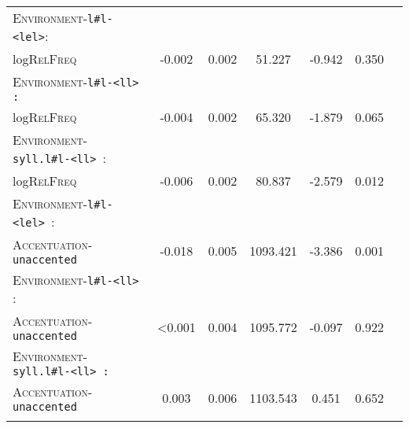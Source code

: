 \begin{table}
{\begin{tabular}{lSSSSSS}
		\textsc{Environment}-\texttt{l\#l-<lel>}: &&&&&\\
		log\textsc{RelFreq }& \color{lsLightGray}-0.002 &\color{lsLightGray} 0.002 & \color{lsLightGray}51.227 &\color{lsLightGray} -0.942 & \color{lsLightGray}0.350 \\ 
		
		\textsc{Environment}-\texttt{l\#l-<ll> :}  &&&&&\\
		log\textsc{RelFreq }&\color{lsLightGray} -0.004 & \color{lsLightGray}0.002 &\color{lsLightGray} 65.320 & \color{lsLightGray}-1.879 &\color{lsLightGray} 0.065 \\ 
		
		\textsc{Environment}-\texttt{syll.l\#l-<ll> }: &&&&&\\
		log\textsc{RelFreq }& -0.006 & 0.002 & 80.837 & -2.579 & 0.012 \\ 
		
		\textsc{Environment}-\texttt{l\#l-<lel> }: &&&&&\\
		\textsc{Accentuation}-\texttt{unaccented} & -0.018 & 0.005 & 1093.421 & -3.386 & 0.001 \\ 
		
		\textsc{Environment}-\texttt{l\#l-<ll> }: &&&&&\\
		\textsc{Accentuation}-\texttt{unaccented} & \color{lsLightGray}<0.001&\color{lsLightGray} 0.004 &\color{lsLightGray} 1095.772 & \color{lsLightGray}-0.097 & \color{lsLightGray}0.922 \\ 
		
		\textsc{Environment}-\texttt{syll.l\#l-<ll> :} &&&&&\\
		\textsc{Accentuation}-\texttt{unaccented} &\color{lsLightGray} 0.003 & \color{lsLightGray}0.006 &\color{lsLightGray} 1103.543 & \color{lsLightGray}0.451 &\color{lsLightGray} 0.652 \\ 
	\lspbottomrule 
			\end{tabular}}
\end{table}




